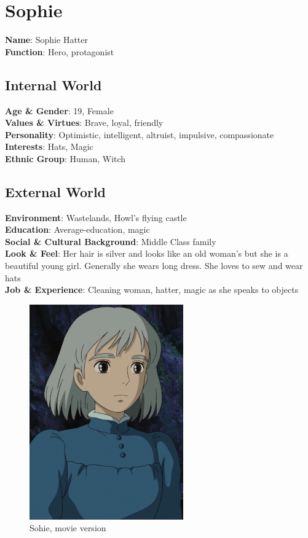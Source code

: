 \section{Sophie}

\begin{minipage}{0.5\textwidth}
\textbf{Name}: Sophie Hatter \\
\textbf{Function}: Hero, protagonist

\subsection{Internal World}

\textbf{Age \& Gender}: 19, Female \\
\textbf{Values \& Virtues}: Brave, loyal, friendly \\
\textbf{Personality}: Optimistic, intelligent, altruist, impulsive, compassionate \\
\textbf{Interests}: Hats, Magic \\
\textbf{Ethnic Group}: Human, Witch

\subsection{External World}
\textbf{Environment}: Wastelands, Howl’s flying castle \\
\textbf{Education}: Average-education, magic \\
\textbf{Social \& Cultural Background}: Middle Class family \\
\textbf{Look \& Feel}: Her hair is silver and looks like an old woman's but she is a beautiful young girl. Generally she wears long dress. She loves to sew and wear hats \\
\textbf{Job \& Experience}: Cleaning woman, hatter, magic as she speaks to objects \\

\end{minipage}%
%
\hfill\begin{minipage}{0.4\textwidth}
\begin{figure}[H]
  \includegraphics{Images/Characters/sophie_portrait}
  \caption{Sohie, movie version}
  \end{figure}
\end{minipage}


